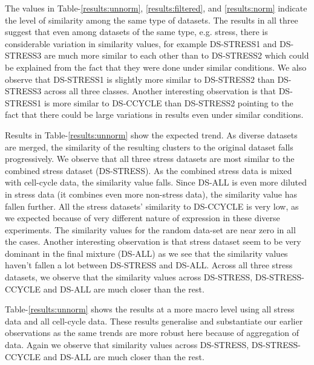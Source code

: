The values in Table-\ref{results:unnorm}, \ref{results:filtered}, and \ref{results:norm} indicate the level of similarity among the same type of datasets. The results in all three suggest that even among datasets of the same type, e.g. stress, there is considerable variation in similarity values, for example DS-STRESS1 and DS-STRESS3 are much more similar to each other than to DS-STRESS2 which could be explained from the fact that they were done under similar conditions. We also observe that DS-STRESS1 is slightly more similar to DS-STRESS2 than DS-STRESS3 across all three classes. Another interesting observation is that DS-STRESS1 is more similar to DS-CCYCLE than DS-STRESS2 pointing to the fact that there could be large variations in results even under similar conditions.

Results in Table-\ref{results:unnorm} show the expected trend. As diverse datasets are merged, the similarity of the resulting clusters to the original dataset falls progressively. We observe that all three stress datasets are most similar to the combined stress dataset (DS-STRESS). As the combined stress data is mixed with cell-cycle data, the similarity value falls. Since DS-ALL is even more diluted in stress data (it combines even more non-stress data), the similarity value has fallen further. All the stress datasets' similarity to DS-CCYCLE is very low, as we expected because of very different nature of expression in these diverse experiments. The similarity values for the random data-set are near zero in all the cases. Another interesting observation is that stress dataset seem to be very dominant in the final mixture (DS-ALL) as we see that the similarity values haven't fallen a lot between DS-STRESS and DS-ALL. Across all three stress datasets, we observe that the similarity values across DS-STRESS, DS-STRESS-CCYCLE and DS-ALL are much closer than the rest.

Table-\ref{results:unnorm} shows the results at a more macro level using all stress data and all cell-cycle data. These results generalise and substantiate our earlier observations as the same trends are more robust here because of aggregation of data. Again we observe that similarity values across DS-STRESS, DS-STRESS-CCYCLE and DS-ALL are much closer than the rest.

